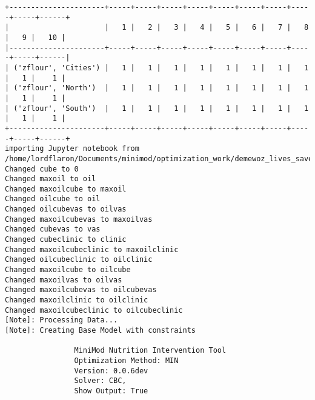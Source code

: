 \documentclass[
]{article}
\begin{document}
\begin{verbatim}
+----------------------+-----+-----+-----+-----+-----+-----+-----+-----+-----+------+
|                      |   1 |   2 |   3 |   4 |   5 |   6 |   7 |   8 |   9 |   10 |
|----------------------+-----+-----+-----+-----+-----+-----+-----+-----+-----+------|
| ('zflour', 'Cities') |   1 |   1 |   1 |   1 |   1 |   1 |   1 |   1 |   1 |    1 |
| ('zflour', 'North')  |   1 |   1 |   1 |   1 |   1 |   1 |   1 |   1 |   1 |    1 |
| ('zflour', 'South')  |   1 |   1 |   1 |   1 |   1 |   1 |   1 |   1 |   1 |    1 |
+----------------------+-----+-----+-----+-----+-----+-----+-----+-----+-----+------+
importing Jupyter notebook from /home/lordflaron/Documents/minimod/optimization_work/demewoz_lives_saved/vas_effective_coverage_analysis.ipynb
Changed cube to 0
Changed maxoil to oil
Changed maxoilcube to maxoil
Changed oilcube to oil
Changed oilcubevas to oilvas
Changed maxoilcubevas to maxoilvas
Changed cubevas to vas
Changed cubeclinic to clinic
Changed maxoilcubeclinic to maxoilclinic
Changed oilcubeclinic to oilclinic
Changed maxoilcube to oilcube
Changed maxoilvas to oilvas
Changed maxoilcubevas to oilcubevas
Changed maxoilclinic to oilclinic
Changed maxoilcubeclinic to oilcubeclinic
[Note]: Processing Data...
[Note]: Creating Base Model with constraints

                MiniMod Nutrition Intervention Tool
                Optimization Method: MIN
                Version: 0.0.6dev
                Solver: CBC,
                Show Output: True
                

\end{verbatim}
\end{document}
